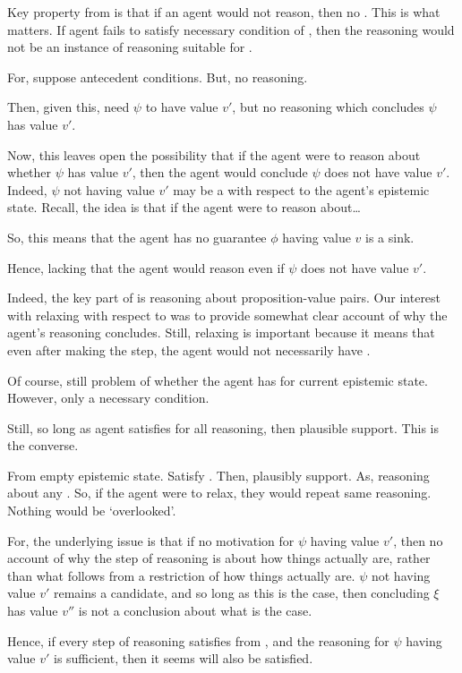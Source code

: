 \begin{note}
  Key property from \ideaS{} is that if an agent would not reason, then no \support{}.
  This is what matters.
  If agent fails to satisfy necessary condition of \ideaCS{}, then the reasoning would not be an instance of reasoning suitable for \support{}.

  For, suppose antecedent conditions.
  But, no reasoning.

  Then, given this, need \(\psi\) to have value \(v'\), but no reasoning which concludes \(\psi\) has value \(v'\).

  Now, this leaves open the possibility that if the agent were to reason about whether \(\psi\) has value \(v'\), then the agent would conclude \(\psi\) does not have value \(v'\).
  Indeed, \(\psi\) not having value \(v'\) may be a \sink{} with respect to the agent's epistemic state.
  Recall, the idea is that if the agent were to reason about\dots

  So, this means that the agent has no guarantee \(\phi\) having value \(v\) is a sink.

  Hence, lacking that the agent would reason even if \(\psi\) does not have value \(v'\).

  Indeed, the key part of \ideaS{} is reasoning about \epVAd{} proposition-value pairs.
  Our interest with relaxing with respect to \ideaS{} was to provide somewhat clear account of why the agent's reasoning concludes.
  Still, relaxing is important because it means that even after making the step, the agent would not necessarily have \support{}.

  Of course, still problem of whether the agent has \support{} for current epistemic state.
  However, only a necessary condition.

  Still, so long as agent satisfies \ideaCS{} for all reasoning, then plausible support.
  This is the converse.
\end{note}

\begin{note}
  From empty epistemic state.
  Satisfy \ideaCS{}.
  Then, plausibly support.
  As, reasoning about any \requ{}.
  So, if the agent were to relax, they would repeat same reasoning.
  Nothing would be `overlooked'.
\end{note}

\begin{note}
  \color{red}
  For, the underlying issue is that if no motivation for \(\psi\) having value \(v'\), then no account of why the step of reasoning is about how things actually are, rather than what follows from a restriction of how things actually are.
  \(\psi\) not having value \(v'\) remains a candidate, and so long as this is the case, then concluding \(\xi\) has value \(v''\) is not a conclusion about what is the case.

  Hence, if every step of reasoning satisfies \ideaCS{} from \epPAd{} \world{}, and the reasoning for \(\psi\) having value \(v'\) is sufficient, then it seems \ideaS{} will also be satisfied.
\end{note}

